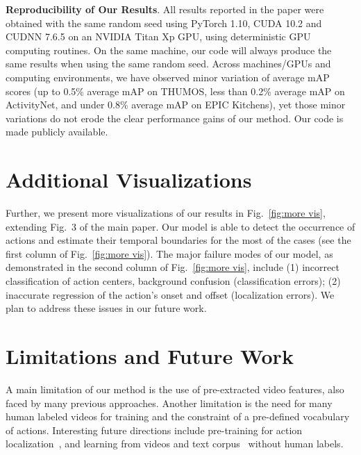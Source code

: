 \medskip
\noindent \textbf{Reproducibility of Our Results}. All results reported in the paper were obtained with the same random seed using PyTorch 1.10, CUDA 10.2 and CUDNN 7.6.5 on an NVIDIA Titan Xp GPU, using deterministic GPU computing routines. On the same machine, our code will always produce the same results when using the same random seed. Across machines/GPUs and computing environments, we have observed minor variation of average mAP scores (up to 0.5\% average mAP on THUMOS, less than 0.2\% average mAP on ActivityNet, and under 0.8\% average mAP on EPIC Kitchens), yet those minor variations do not erode the clear performance gains of our method. Our code is made publicly available.\medskip

\section{Additional Visualizations}\label{sec:appendix:vis}
Further, we present more visualizations of our results in Fig.\ \ref{fig:more vis}, extending Fig.\ 3 of the main paper. Our model is able to detect the occurrence of actions and estimate their temporal boundaries for the most of the cases (see the first column of Fig.\ \ref{fig:more vis}). The major failure modes of our model, as demonstrated in the second column of Fig.\ \ref{fig:more vis}, include (1) incorrect classification of action centers, \ie background confusion (classification errors); (2) inaccurate regression of the action's onset and offset (localization errors). We plan to address these issues in our future work.

\section{Limitations and Future Work}\label{sec:appendix:limit}
A main limitation of our method is the use of pre-extracted video features, also faced by many previous approaches. Another limitation is the need for many human labeled videos for training and the constraint of a pre-defined vocabulary of actions. Interesting future directions include pre-training for action localization~\cite{tspiccvworkshop2021,xu2021boundary}, and learning from videos and text corpus~\cite{radford2021learning,jia2021scaling} without human labels.

